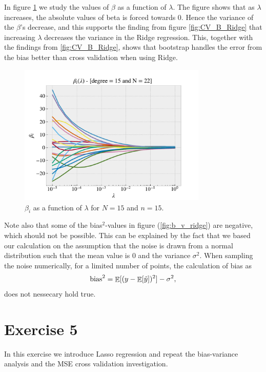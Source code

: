 \documentclass[norsk,a4paper,12pt]{scrartcl}
\DeclareMathOperator*{\E}{\mathbb{E}}
\begin{document}
In figure \ref{fig:lamda_depend} we study the values of $\beta$ as a function of $\lambda$. The figure shows that as $\lambda$ increases, the absolute values of beta is forced towards 0. Hence the variance of the $\beta$'s decrease, and this supports the finding from figure \ref{fig:CV_B_Ridge}  that increasing $\lambda$ decreases the variance in the Ridge regression. This, together with the findings from \ref{fig:CV_B_Ridge}, shows that bootstrap handles the error from the bias better than cross validation when using Ridge.
\begin{figure}[H]
    \centering
    \includegraphics[width=0.80\textwidth]{figures/lamda_depend_betas.pdf}
    \caption{$\beta_i$ as a function of $\lambda$ for $N = 15$ and $n = 15$.}
    \label{fig:lamda_depend}
\end{figure}
Note also that some of the bias$^2$-values in figure (\ref{fig:b_v_ridge}) are negative, which should not be possible. This can be explained by the fact that we based our calculation on the assumption that the noise is drawn from a normal distribution such that the mean value is 0 and the variance $\sigma^2$. When sampling the noise numerically, for a limited number of points, the calculation of bias as 
\begin{align*}
    \text{bias}^2 = \E[(y  -\E[\Tilde{y}])^2] - \sigma^2,
\end{align*}
does not nessecary hold true. 
\newpage

\section{Exercise 5}
In this exercise we introduce Lasso regression and repeat the bias-variance analysis and the MSE cross validation investigation.
\end{document}
